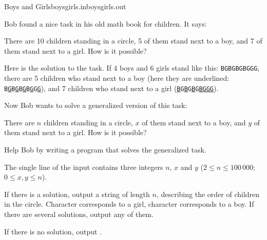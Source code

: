 \begin{problem}{Boys and Girls}{boysgirls.in}{boysgirls.out}{\timeLimit}


Bob found a nice task in his old math book for children. It says:

\begin{displayquote}
There are 10 children standing in a circle, 5 of them stand next to a boy, and 7 of them stand next to a girl. How is it possible?
\end{displayquote}

Here is the solution to the task. If 4 boys and 6 girls stand like this: \texttt{BGBGBGBGGG},
there are 5 children who stand next to a boy
(here they are underlined: \texttt{B\underline{G}B\underline{G}B\underline{G}B\underline{G}G\underline{G}}),
and 7 children who stand next to a girl (\texttt{\underline{B}G\underline{B}G\underline{B}G\underline{B}\underline{G}\underline{G}\underline{G}}).

Now Bob wants to solve a generalized version of this task:

\begin{displayquote}
There are $n$ children standing in a circle, $x$ of them stand next to a boy, and $y$ of them stand next to a girl. How is it possible?
\end{displayquote}

Help Bob by writing a program that solves the generalized task.

\InputFile

The single line of the input contains three integers $n$, $x$ and $y$
($2 \leq n \leq 100\,000$; $0\leq x, y\leq n$).

\OutputFile

If there is a solution, output a string of length $n$, describing the order of children in the circle. Character  corresponds to a girl, character  corresponds to a boy.
If there are several solutions, output any of them.

If there is no solution, output .

\Examples

\begin{example}
%
%
\end{example}

\end{problem}
